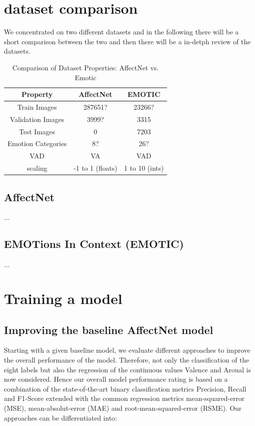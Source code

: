 \documentclass[conference]{IEEEtran}
\begin{document}

\section{dataset comparison}
We concentrated on two different datasets and in the following there will be a short comparison between the two and then there will be a in-detph review of the datasets.

\begin{table}[htbp]
\centering
\begin{tabular}{ c | c c }
 Property & AffectNet & EMOTIC \\ 
\hline
 Train Images & 287651? & 23266? \\
 Validation Images & 3999? & 3315 \\
 Test Images & 0 & 7203 \\
 Emotion Categories & 8? & 26? \\
 VAD & VA & VAD \\
 scaling & -1 to 1 (floats) & 1 to 10 (ints) \\
\end{tabular}
\caption{Comparison of Dataset Properties: AffectNet vs. Emotic}
\label{tab:dataset_properties}
\end{table}


\subsection{AffectNet}
...

\subsection{EMOTions In Context (EMOTIC)}
...

\newpage
\section{Training a model}

\subsection{Improving the baseline AffectNet model}
Starting with a given baseline model, we evaluate different approaches to improve the overall performance of the model. Therefore, not only the classification of the eight labels but also the regression of the continuous values Valence and Aroual is now considered. Hence our overall model performance rating is based on a combination of the state-of-the-art binary classification metrics Precision, Recall and F1-Score extended with the common regression metrics mean-squared-error (MSE), mean-absolut-error (MAE) and root-mean-squared-error (RSME). Our approaches can be differentiated into:
\end{document}
